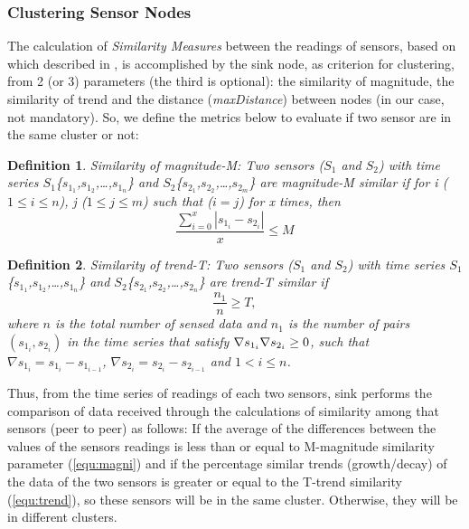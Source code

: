 \documentclass[conference]{IEEEtran}
\begin{document}
\subsubsection{Clustering Sensor Nodes}
\label{clustering-sensors}

The calculation of \textit{Similarity Measures} between the readings of sensors,
based on which described in \cite{Liu2007}, is accomplished by the sink node, as
criterion for clustering, from 2 (or 3) parameters (the third is
optional):
the similarity of magnitude, the similarity of trend and the distance
(\textit{maxDistance}) between nodes (in our case, not mandatory). So, we define
the metrics below to evaluate if two sensor are in the same cluster or not:

\newtheorem{defini}{Definition}

\begin{defini}
Similarity of magnitude-M: Two sensors ($S_{1}$ and $S_{2}$) with time series
$S_{1}$\{$s_{1_1}$,$s_{1_2}$,\ldots,$s_{1_n}$\} and
$S_{2}$\{$s_{2_1}$,$s_{2_2}$,\ldots,$s_{2_m}$\} are magnitude-M similar if for
{\it i} ($1\leq i\leq n$), {\it j} ($1\leq j\leq m$) such that ($i = j$) for x times,
then 
\begin{equation}
\label{equ:magni}
\frac{\sum_{i = 0}^{x} |s_{1_i}-s_{2_i}|}{x} \leq M
\end{equation}
\end{defini}

\begin{defini}
Similarity of trend-T: Two sensors ($S_{1}$ and $S_{2}$) with time series
$S_{1}$\{$s_{1_1}$,$s_{1_2}$,\ldots,$s_{1_n}$\} and
$S_{2}$\{$s_{2_1}$,$s_{2_2}$,\ldots,$s_{2_n}$\} are trend-T similar if 
\begin{equation}
\label{equ:trend}
\frac{n_{1}}{n} \geq T,
\end{equation}
where $n$ is the total number of sensed data and $n_{1}$ is the number of pairs
$(s_{1_i},s_{2_i})$ in the time series that satisfy $\nabla s_{1_i} \* \nabla
s_{2_i} \geq 0$, such that $\nabla s_{1_i} = s_{1_i} - s_{1_{i-1}}$, $\nabla
s_{2_i} = s_{2_i} - s_{2_{i-1}}$ and $1 < i \leq n$.
\end{defini}

Thus, from the time series of readings of each two sensors, sink performs the
comparison of data received through the calculations of similarity among that
sensors (peer to peer) as follows:
If the average of the differences between the values of the sensors readings is
less than or equal to M-magnitude similarity parameter (\ref{equ:magni}) and if
the percentage similar trends (growth/decay) of the data of the two sensors is
greater or equal to the T-trend similarity (\ref{equ:trend}), so these sensors
will be in the same cluster.
Otherwise, they will be in different clusters.
\end{document}
